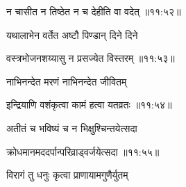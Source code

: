 
{\devanagarifont न चासीत न तिष्ठेत न च देहीति वा वदेत् {॥११:५२॥} \veg\dontdisplaylinenum }%
 
{\devanagarifont यथालाभेन वर्तेत अष्टौ पिण्डान् दिने दिने \thinspace{\dandab} \dontdisplaylinenum }%


{\devanagarifont वस्त्रभोजनशय्यासु न प्रसज्येत विस्तरम् {॥११:५३॥} \veg\dontdisplaylinenum }%

{\devanagarifont नाभिनन्देत मरणं नाभिनन्देत जीवितम् \thinspace{\dandab} \dontdisplaylinenum }%


{\devanagarifont इन्द्रियाणि वशंकृत्वा कामं हत्वा यतव्रतः {॥११:५४॥} \veg\dontdisplaylinenum }%

{\devanagarifont अतीतं च भविष्यं च न भिक्षुश्चिन्तयेत्सदा \thinspace{\dandab} \dontdisplaylinenum }%


{\devanagarifont क्रोधमानमददर्पान्परिव्राड्वर्जयेत्सदा {॥११:५५॥} \veg\dontdisplaylinenum }%

{\devanagarifont विरागं तु धनुः कृत्वा प्राणायामगुणैर्युतम् \thinspace{\dandab} \dontdisplaylinenum }%


